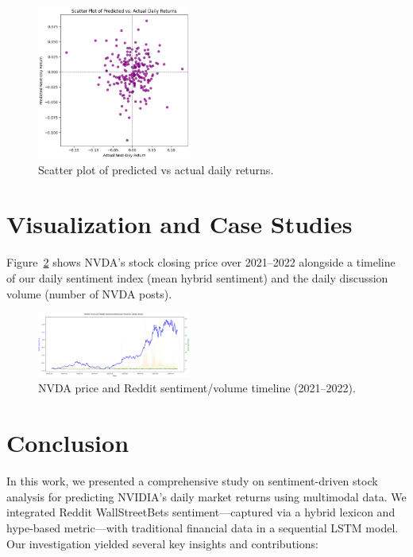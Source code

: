 \documentclass[conference]{IEEEtran}
\begin{document}
\begin{figure}[ht]
	\centering
	\includegraphics[width=0.45\textwidth]{scatter_pred_actual.png}
	\caption{Scatter plot of predicted vs actual daily returns.}
	\label{fig:scatter_pred_actual}
\end{figure}

\section{Visualization and Case Studies}
Figure~\ref{fig:sentiment_price_timeline} shows NVDA’s stock closing price over 2021--2022 alongside a timeline of our daily sentiment index (mean hybrid sentiment) and the daily discussion volume (number of NVDA posts).

\begin{figure}[ht]
	\centering
	\includegraphics[width=0.45\textwidth]{sentiment_price_timeline.png}
	\caption{NVDA price and Reddit sentiment/volume timeline (2021–2022).}
	\label{fig:sentiment_price_timeline}
\end{figure}

\section{Conclusion}
In this work, we presented a comprehensive study on sentiment-driven stock analysis for predicting NVIDIA’s daily market returns using multimodal data. We integrated Reddit WallStreetBets sentiment—captured via a hybrid lexicon and hype-based metric—with traditional financial data in a sequential LSTM model. Our investigation yielded several key insights and contributions:
\end{document}
